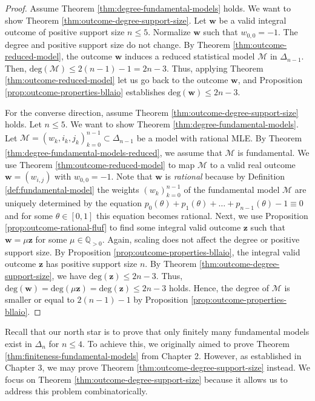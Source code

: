 \begin{proof}
    Assume Theorem \ref{thm:degree-fundamental-models} holds. We want to show Theorem \ref{thm:outcome-degree-support-size}. Let \( \mathbf{w} \) be a valid integral outcome of positive support size \( n \leq 5 \). Normalize \( \mathbf{w} \) such that \( w_{0,0} = -1 \). The degree and positive support size do not change. By Theorem \ref{thm:outcome-reduced-model}, the outcome \( \mathbf{w} \) induces a reduced statistical model \( \mathcal{M} \) in \( \Delta_{n-1} \). Then, \( \mathrm{deg}(\mathcal{M}) \leq 2(n-1) -1 = 2n - 3\). Thus, applying Theorem \ref{thm:outcome-reduced-model} let us go back to the outcome \( \mathbf w \), and Proposition \ref{prop:outcome-properties-bllaio} establishes \( \mathrm{deg}(\mathbf w) \leq 2n - 3 \).

    For the converse direction, assume Theorem \ref{thm:outcome-degree-support-size} holds. Let \( n \leq 5 \). We want to show Theorem \ref{thm:degree-fundamental-models}. Let \( \mathcal{M} = (w_k, i_k, j_k)_{k=0}^{n-1} \subset \Delta_{n-1} \) be a model with rational MLE. By Theorem \ref{thm:degree-fundamental-models-reduced}, we assume that \( \mathcal{M} \) is fundamental. We use Theorem \ref{thm:outcome-reduced-model} to map \( \mathcal{M} \) to a valid real outcome \( \mathbf{w} = (w_{i,j}) \) with \( w_{0,0} = -1 \). Note that \( \mathbf{w}  \) is \emph{rational} because by Definition \ref{def:fundamental-model} the weights \( (w_k)_{k=0}^{n-1} \) of the fundamental model \( \mathcal{M} \) are uniquely determined by the equation \( p_0(\theta) + p_1(\theta) + \dots + p_{n-1}(\theta) - 1 \equiv 0 \) and for some \( \theta \in [0,1] \) this equation becomes rational. Next, we use Proposition \ref{prop:outcome-rational-fluf} to find some integral valid outcome \( \mathbf{z} \) such that \( \mathbf w = \mu \mathbf{z} \) for some \( \mu \in \mathbb{Q}_{>0} \). Again, scaling does not affect the degree or positive support size. By Proposition \ref{prop:outcome-properties-bllaio}, the integral valid outcome  \( \mathbf{z} \) has positive support size \( n  \). By Theorem \ref{thm:outcome-degree-support-size}, we have \( \mathrm{deg}(\mathbf z) \leq 2n - 3 \). Thus, \( \mathrm{deg}(\mathbf w) = \mathrm{deg}(\mu \mathbf z) = \mathrm{deg}(\mathbf z) \leq 2n - 3 \) holds. Hence, the degree of \( \mathcal{M} \) is smaller or equal to \( 2(n-1) - 1 \) by Proposition \ref{prop:outcome-properties-bllaio}.
\end{proof}

Recall that our north star is to prove that only finitely many fundamental models exist in \( \Delta_n \) for \( n \leq 4 \). To achieve this, we originally aimed to prove Theorem \ref{thm:finiteness-fundamental-models} from Chapter 2. However, as established in Chapter 3, we may prove Theorem \ref{thm:outcome-degree-support-size} instead. We focus on Theorem \ref{thm:outcome-degree-support-size} because it allows us to address this problem combinatorically.
